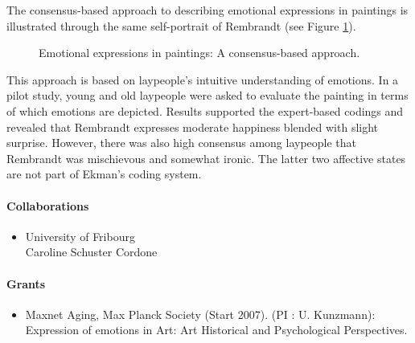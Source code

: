 The consensus-based approach to describing emotional expressions in paintings is illustrated through the same self-portrait of Rembrandt (see Figure \ref{fig3:profUteKunzmann}). 

\begin{figure}[htb]
  \begin{center}
    \caption{Emotional expressions in paintings: A consensus-based approach.}
    \label{fig3:profUteKunzmann}
  \end{center}
\end{figure}

This approach is based on laypeople's intuitive understanding of emotions. In a pilot study, young and old laypeople were asked to evaluate the painting in terms of which emotions are depicted. Results supported the expert-based codings and revealed that Rembrandt expresses moderate happiness blended with slight surprise. However, there was also high consensus among laypeople that Rembrandt was mischievous and somewhat ironic. The latter two affective states are not part of Ekman's coding system.

\paragraph{Collaborations}
\begin{itemize}
\item University of Fribourg \\ Caroline Schuster Cordone
\end{itemize}

\paragraph{Grants}

\begin{itemize}
\item Maxnet Aging, Max Planck Society (Start 2007). (PI : U. Kunzmann): Expression of emotions in Art: Art Historical and Psychological Perspectives.
\end{itemize}